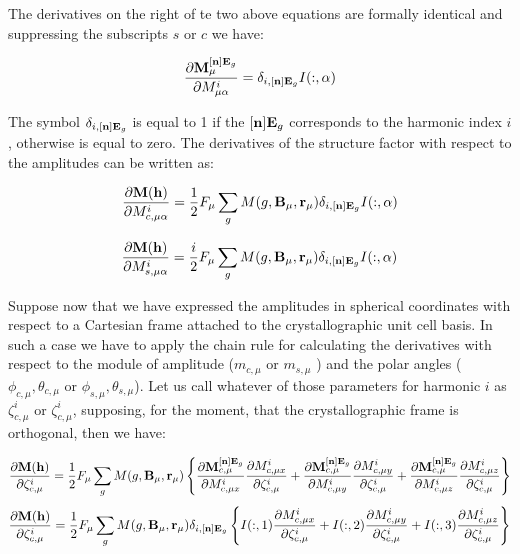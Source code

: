 \documentclass[10pt]{article}
\begin{document}
The derivatives on the right of te two above equations are formally identical and suppressing the subscripts $s$ or $c$ we have:

\begin{equation} \label{der_msincos}
 \frac{\partial {\bf M}_{\mu}^{[{\bf n}]{\bf E}_g}}{\partial M_{\mu\alpha}^{i}}=\delta_{i,{[{\bf n}]{\bf E}_g}} I(:,\alpha)
\end{equation}

The symbol $\delta_{i,{[{\bf n}]{\bf E}_g}} $ is equal to 1 if the $[{\bf n}]{\bf E}_g$ corresponds to the harmonic index $i$, otherwise is equal to zero. The derivatives of the structure factor with respect to the amplitudes can be written as:

\begin{equation} \label{der_mcos2}
\frac{\partial{\bf M}({\bf h})}{\partial M_{c,\mu\alpha}^{i}}= \frac{1}{2} F_\mu \sum_g M(g,{\bf B}_\mu,{\bf r}_\mu) \delta_{i,{[{\bf n}]{\bf E}_g}} I(:,\alpha)
\end{equation}

\begin{equation} \label{der_msin2}
\frac{\partial{\bf M}({\bf h})}{\partial M_{s,\mu\alpha}^{i}}= \frac{i}{2} F_\mu \sum_g M(g,{\bf B}_\mu,{\bf r}_\mu) \delta_{i,{[{\bf n}]{\bf E}_g}} I(:,\alpha)
\end{equation}

Suppose now that we have expressed the amplitudes in spherical coordinates with respect to a Cartesian frame attached to the crystallographic unit cell basis. In such a case we have to apply the chain rule for calculating the derivatives with respect to the module of amplitude ($m_{c,\mu}$ or $m_{s,\mu}$ ) and the polar angles ($\phi_{c,\mu}, \theta_{c,\mu}$ or $ \phi_{s,\mu}, \theta_{s,\mu} $). Let us call whatever of those parameters for harmonic $i$ as $\zeta_{c,\mu}^i$ or $\zeta_{c,\mu}^i$, supposing, for the moment, that the crystallographic frame is orthogonal, then we have:

\begin{equation} \label{der_spher}
\frac{\partial{\bf M}({\bf h})}{\partial \zeta_{c,\mu}^i}= \frac{1}{2} F_\mu \sum_g M(g,{\bf B}_\mu,{\bf r}_\mu) \left\lbrace\frac{\partial {\bf M}_{c,\mu}^{[{\bf n}]{\bf E}_g}}{\partial M_{c,\mu x}^{i}} \frac{\partial M_{c,\mu x}^{i}}{\partial \zeta_{c,\mu}^i}+ \frac{\partial {\bf M}_{c,\mu}^{[{\bf n}]{\bf E}_g}}{\partial M_{c,\mu y}^{i}} \frac{\partial M_{c,\mu y}^{i}}{\partial \zeta_{c,\mu}^i}+ \frac{\partial {\bf M}_{c,\mu}^{[{\bf n}]{\bf E}_g}}{\partial M_{c,\mu z}^{i}}\frac{\partial M_{c,\mu z}^{i}}{\partial \zeta_{c,\mu}^i}\right\rbrace    
\end{equation}
\begin{equation} \label{der_spher2}
\frac{\partial{\bf M}({\bf h})}{\partial \zeta_{c,\mu}^i}= \frac{1}{2} F_\mu \sum_g M(g,{\bf B}_\mu,{\bf r}_\mu) \delta_{i,{[{\bf n}]{\bf E}_g}}  \left\lbrace  I(:,1) \frac{\partial M_{c,\mu x}^{i}}{\partial \zeta_{c,\mu}^i} + I(:,2) \frac{\partial M_{c,\mu y}^{i}}{\partial \zeta_{c,\mu}^i}+ I(:,3)\frac{\partial M_{c,\mu z}^{i}}{\partial \zeta_{c,\mu}^i}  \right\rbrace 
\end{equation}
\end{document}
